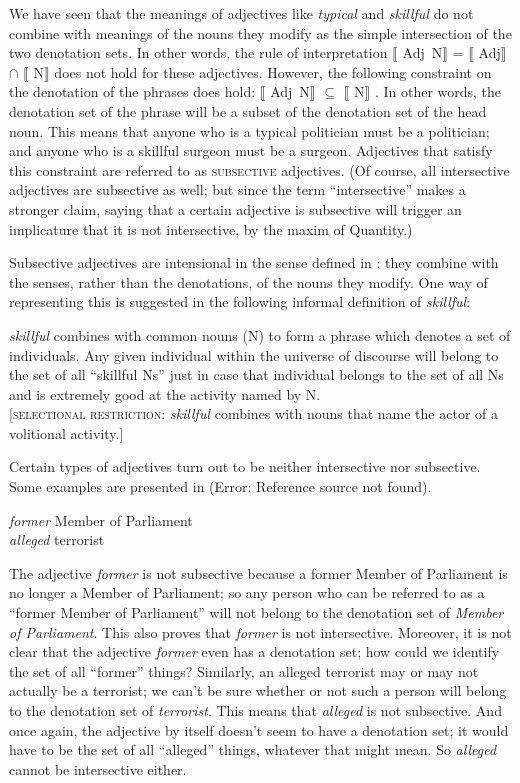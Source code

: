 We have seen that the meanings of adjectives like \textit{typical} and \textit{skillful} do not combine with meanings of the nouns they modify as the simple intersection of the two denotation sets. In other words, the rule of interpretation $\llbracket$ Adj~N$\rrbracket$  = $\llbracket$ Adj$\rrbracket$  ${\cap}$ $\llbracket$ N$\rrbracket$  does not hold for these adjectives. However, the following constraint on the denotation of the phrases does hold: $\llbracket$ Adj~N$\rrbracket$  ${\subseteq}$ $\llbracket$ N$\rrbracket$ . In other words, the denotation set of the phrase will be a subset of the denotation set of the head noun. This means that anyone who is a typical politician must be a politician; and anyone who is a skillful surgeon must be a surgeon. Adjectives that satisfy this constraint are referred to as \textsc{subsective} adjectives. (Of course, all intersective adjectives are subsective as well; but since the term “intersective” makes a stronger claim, saying that a certain adjective is subsective will trigger an implicature that it is not intersective, by the maxim of Quantity.)



Subsective adjectives are intensional in the sense defined in : they combine with the senses, rather than the denotations, of the nouns they modify. One way of representing this is suggested in the following informal definition of \textit{skillful}:


\ea
\textit{skillful} combines with common nouns (N) to form a phrase which denotes a set of individuals. Any given individual within the universe of discourse will belong to the set of all “skillful Ns” just in case that individual belongs to the set of all Ns and is extremely good at the activity named by N.\\
{}[\textsc{selectional restriction}: \textit{skillful} combines with nouns that name the actor of a volitional activity.]
\z


Certain types of adjectives turn out to be neither intersective nor subsective. Some examples are presented in (Error: Reference source not found).


\ea
\ea \textit{former} Member of Parliament\\
\ex \textit{alleged} terrorist
\z \z


The adjective \textit{former} is not subsective because a former Member of Parliament is no longer a Member of Parliament; so any person who can be referred to as a “former Member of Parliament” will not belong to the denotation set of \textit{Member of Parliament}. This also proves that \textit{former} is not intersective. Moreover, it is not clear that the adjective \textit{former} even has a denotation set; how could we identify the set of all “former” things? Similarly, an alleged terrorist may or may not actually be a terrorist; we can’t be sure whether or not such a person will belong to the denotation set of \textit{terrorist}. This means that \textit{alleged} is not subsective. And once again, the adjective by itself doesn’t seem to have a denotation set; it would have to be the set of all “alleged” things, whatever that might mean. So \textit{alleged} cannot be intersective either.



